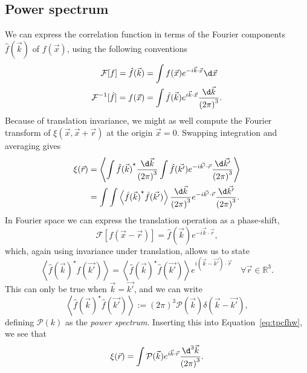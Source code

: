 \begin{subappendices}
\subsection{Power spectrum}
We can express the correlation function in terms of the Fourier components
$\hat{f}(\vec{k})$ of $f(\vec{x})$, using the following conventions
\begin{align}
    \mathcal{F}[f] = \hat{f}(\vec{k}) &= \int f(\vec{x}) e^{-i\vec{k}\cdot\vec{x}} \d\vec{x}\\
    \mathcal{F}^{-1} \lbrack\hat{f}\rbrack = f(\vec{x}) &= \int \hat{f}(\vec{k})
    e^{i\vec{k}\cdot\vec{x}} \frac{\d\vec{k}}{{(2\pi)}^3}.
\end{align}
Because of translation invariance, we might as well compute the Fourier transform of $\xi(\vec{x},\vec{x} + \vec{r})$ at the origin $\vec{x} = 0$. Swapping integration and averaging gives
\begin{align}
\xi(\vec{r}) &= \left<
    \int{\hat{f}(\vec{k})}^{\star}
    \frac{\d\vec{k}}{{(2\pi)}^3}
    \int\hat{f}(\vec{k'})e^{-i\vec{k'}\cdot\vec{r}}
    \frac{\d\vec{k'}}{{(2\pi)}^3} \right> \\
&= \int\int\left< {\hat{f}(\vec{k})}^{\star} \hat{f}(\vec{k'})\right>
    \frac{\d\vec{k}}{{(2\pi)}^3}
    e^{-i\vec{k'}\cdot\vec{r}}
    \frac{\d\vec{k'}}{{(2\pi)}^3}.
    \label{eq:tpcfhw}
\end{align}
In Fourier space we can express the translation operation as a phase-shift,
\begin{equation}
    \mathcal{F}[f(\vec{x} - \vec{r})] = \hat{f}(\vec{k}) e^{-i \vec{k}
    \cdot \vec{r}},
\end{equation}
which, again using invariance under translation, allows us to state
\begin{equation}
    \left<{\hat{f}(\vec{k})}^{\star}\hat{f}(\vec{k'}) \right> = \left<
    {\hat{f}(\vec{k})}^{\star}\hat{f}(\vec{k'}) \right> e^{i(\vec{k} -
    \vec{k'}) \cdot \vec{r}}\quad \forall \vec{r} \in \mathbb{R}^3.
\end{equation}
This can only be true when $\vec{k} = \vec{k'}$, and we can write
\begin{equation}
    \left< {\hat{f}(\vec{k})}^{\star}\hat{f}(\vec{k'}) \right> :=
    {(2\pi)}^3 \mathcal{P}(\vec{k})\delta(\vec{k} - \vec{k'}),
    \label{eq:powerdef}
\end{equation}
defining $\mathcal{P}(k)$ as the \emph{power spectrum}. Inserting this into Equation~\ref{eq:tpcfhw}, we see that
\begin{equation}
    \xi(\vec{r}) = \int \mathcal{P}(\vec{k}) e^{i\vec{k}\cdot\vec{r}} \frac{\d^3
    \vec{k}}{{(2\pi)}^3}.
\end{equation}


\end{subappendices}
